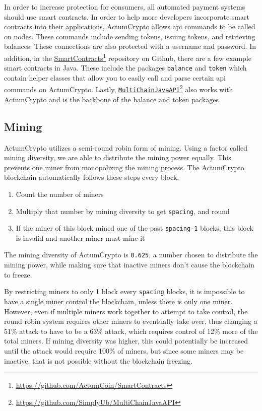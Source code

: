 \documentclass[letter]{article}
\newcommand{\footlink}[2]{\href{#1}{#2}\footnote{\url{#1}}}
\begin{document}
In order to increase protection for consumers, all automated payment systems should use smart contracts. In order to help more developers incorporate smart contracts into their applications, ActumCrypto allows api commands to be called on nodes. These commands include sending tokens, issuing tokens, and retrieving balances. These connections are also protected with a username and password. In addition, in the \footlink{https://github.com/ActumCoin/SmartContracts}{SmartContracts} repository on Github, there are a few example smart contracts in Java. These include the packages \texttt{balance} and \texttt{token} which contain helper classes that allow you to easily call and parse certain api commands on ActumCrypto. Lastly, \footlink{https://github.com/SimplyUb/MultiChainJavaAPI}{\texttt{MultiChainJavaAPI}} also works with ActumCrypto and is the backbone of the balance and token packages.

\subsection{Mining}
ActumCrypto utilizes a semi-round robin form of mining. Using a factor called mining diversity, we are able to distribute the mining power equally. This prevents one miner from monopolizing the mining process. The ActumCrypto blockchain automatically follows these steps every block.
\begin{enumerate}
\item Count the number of miners
\item Multiply that number by mining diversity to get \texttt{spacing}, and round
\item If the miner of this block mined one of the past \texttt{spacing-1} blocks, this block is invalid and another miner must mine it
\end{enumerate}

The mining diversity of ActumCrypto is \texttt{0.625}, a number chosen to distribute the mining power, while making sure that inactive miners don’t cause the blockchain to freeze.

By restricting miners to only 1 block every \texttt{spacing} blocks, it is impossible to have a single miner control the blockchain, unless there is only one miner. However, even if multiple miners work together to attempt to take control, the round robin system requires other miners to eventually take over, thus changing a 51\% attack to have to be a 63\% attack, which requires control of 12\% more of the total miners. If mining diversity was higher, this could potentially be increased until the attack would require 100\% of miners, but since some miners may be inactive, that is not possible without the blockchain freezing.
\end{document}
